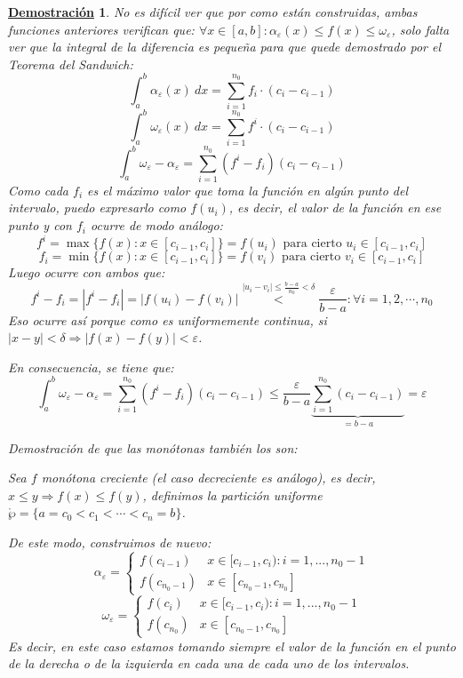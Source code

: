 \documentclass[10pt,a4paper,openright]{book}
\theoremstyle{break}
\newtheorem*{demo}{\underline{Demostración}}
\newcommand{\dif}[1]{\ d#1}
\begin{document}
\begin{demo}
No es difícil ver que por como están construidas, ambas funciones anteriores verifican que: $\forall x\in[a,b]: \alpha_\varepsilon (x)\leq f(x)\leq \omega_\varepsilon$, solo falta ver que la integral de la diferencia es pequeña para que quede demostrado por el Teorema del Sandwich:
$$\int_{a}^{b}\alpha_\varepsilon(x) \dif{x} = \sum_{i = 1}^{n_0} f_i\cdot (c_i-c_{i-1})$$
$$\int_{a}^{b}\omega_\varepsilon(x) \dif{x} = \sum_{i = 1}^{n_0} f^i\cdot (c_i-c_{i-1})$$
$$\int_{a}^{b} \omega_\varepsilon - \alpha_\varepsilon = \sum_{i = 1}^{n_0} (f^i-f_i)(c_i-c_{i-1})$$
Como cada $f_i$ es el máximo valor que toma la función en algún punto del intervalo, puedo expresarlo como $f(u_i)$, es decir, el valor de la función en ese punto y con $f_i$ ocurre de modo análogo:
$$f^i = \max\{f(x): x\in [c_{i-1},c_{i}]\} =  f(u_i) \mbox{ para cierto } u_i\in [c_{i-1},c_{i}]$$
$$f_i = \min\{f(x): x\in [c_{i-1}, c_{i}]\} = f(v_i)\mbox{ para cierto } v_i\in [c_{i-1},c_{i}]$$
Luego ocurre con ambos que:
$$f^i-f_i = |f^i - f_i| = \left|f(u_i)- f(v_i)\right| \stackrel{|u_i-v_i|\leq \frac{b-a}{n_0}<\delta}{<} \frac{\varepsilon}{b-a}: \forall i = 1, 2,\cdots , n_0 $$
Eso ocurre así porque como es uniformemente continua, si $|x-y|<\delta\Rightarrow |f(x)-f(y)|<\varepsilon$.

En consecuencia, se tiene que:
$$\int_{a}^{b} \omega_\varepsilon - \alpha_\varepsilon = \sum_{i = 1}^{n_0} (f^i-f_i)(c_i-c_{i-1}) \leq \frac{\varepsilon}{b-a}\underbrace{\sum_{ i = 1}^{n_0} (c_i-c_{i-1})}_{=b-a} = \varepsilon$$

Demostración de que las monótonas también los son:

Sea $f$ monótona creciente (el caso decreciente es análogo), es decir, $x\leq y\Rightarrow f(x)\leq f(y)$, definimos la partición uniforme $\mathring{\wp} =\{a = c_0 < c_1 < \cdots < c_n = b\}$.

De este modo, construimos de nuevo:
$$\alpha_\varepsilon = \begin{cases} f(c_{i-1}) & x\in [c_{i-1}, c_i): i=1,..., n_0-1 \\ f(c_{n_0-1}) & x\in [c_{n_0-1}, c_{n_0}]\end{cases}$$
$$\omega_\varepsilon = \begin{cases} f(c_{i}) & x\in [c_{i-1}, c_i): i=1,..., n_0-1 \\ f(c_{n_0}) & x\in [c_{n_0-1}, c_{n_0}]\end{cases}$$
Es decir, en este caso estamos tomando siempre el valor de la función en el punto de la derecha o de la izquierda en cada una de cada uno de los intervalos.


\end{demo}
\end{document}
